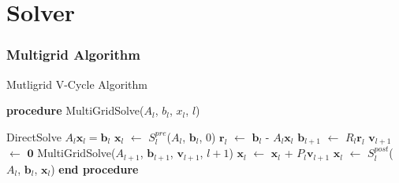 \documentclass[xcolor=pdftex,table,10pt]{beamer}
\begin{document}
    \section{Solver}

	\begin{frame}
		\frametitle{Multigrid Algorithm}

		\begin{block}{Mutligrid V-Cycle Algorithm}
		\begin{algorithmic}[1]
			\STATE \textbf{procedure} MultiGridSolve($A_l$, $b_l$, $x_l$, $l$)

			    \STATE DirectSolve $A_l \mathbf{x}_l = \mathbf{b}_l$
			\ELSE
			    \STATE $\mathbf{x}_l$ $\leftarrow$ $S^{pre}_l$($A_l$, $\mathbf{b}_l$, $0$)
			    \STATE $\mathbf{r}_l$ $\leftarrow$ $\mathbf{b}_l$ - $A_l \mathbf{x}_l$ 
			    \STATE $\mathbf{b}_{l+1}$ $\leftarrow$ $R_l \mathbf{r}_l$ 
			    \STATE $\mathbf{v}_{l+1}$ $\leftarrow$ $\mathbf{0}$
			    \STATE MultiGridSolve($A_{l+1}$, $\mathbf{b}_{l+1}$, $\mathbf{v}_{l+1}$, $l+1$)
			    \STATE $\mathbf{x}_l$ $\leftarrow$ $\mathbf{x}_l$ + $P_l \mathbf{v}_{l+1}$ 
			    \STATE $\mathbf{x}_l$ $\leftarrow$ $S^{post}_l$($A_l$, $\mathbf{b}_l$, $\mathbf{x}_l$)
			\ENDIF
			\STATE \textbf{end procedure}
		\end{algorithmic}
		\end{block}

	\end{frame}
\end{document}
